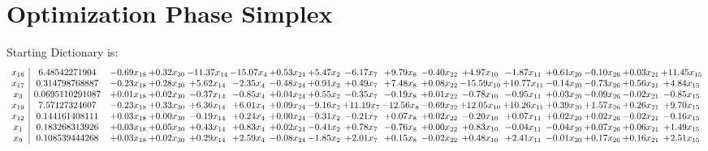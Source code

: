 \documentclass[9pt]{article}
\begin{document}
\section{Optimization Phase Simplex}
Starting Dictionary is:
\[\begin{array}{c| c c@{\hskip 2pt} c@{\hskip 2pt} c@{\hskip 2pt} c@{\hskip 2pt} c@{\hskip 2pt} c@{\hskip 2pt} c@{\hskip 2pt} c@{\hskip 2pt} c@{\hskip 2pt} c@{\hskip 2pt} c@{\hskip 2pt} c@{\hskip 2pt} c@{\hskip 2pt} c@{\hskip 2pt} c@{\hskip 2pt} }
 x_{16}   &  6.48542271904 & -0.69 x_{18} & +  0.32 x_{30} & -11.37 x_{14} & -15.07 x_{4} & +  0.53 x_{24} & +  5.47 x_{2} & -6.17 x_{7} & +  9.79 x_{8} & -0.40 x_{22} & +  4.97 x_{10} & -1.87 x_{11} & +  0.61 x_{20} & -0.10 x_{26} & +  0.03 x_{21} & + 11.45 x_{15}\\
 x_{17}   &  0.314798768887 & -0.23 x_{18} & +  0.28 x_{30} & +  5.62 x_{14} & -2.35 x_{4} & -0.48 x_{24} & +  0.91 x_{2} & +  0.49 x_{7} & +  7.48 x_{8} & +  0.08 x_{22} & -15.59 x_{10} & + 10.77 x_{11} & -0.14 x_{20} & -0.73 x_{26} & +  0.56 x_{21} & +  4.84 x_{15}\\
 x_{3}   &  0.0695110291087 & +  0.01 x_{18} & +  0.02 x_{30} & -0.37 x_{14} & -0.85 x_{4} & +  0.04 x_{24} & +  0.55 x_{2} & -0.35 x_{7} & -0.19 x_{8} & +  0.01 x_{22} & -0.78 x_{10} & -0.95 x_{11} & +  0.03 x_{20} & -0.09 x_{26} & -0.02 x_{21} & -0.85 x_{15}\\
 x_{19}   &  7.57127324607 & -0.23 x_{18} & +  0.33 x_{30} & +  6.36 x_{14} & +  6.01 x_{4} & +  0.09 x_{24} & -9.16 x_{2} & + 11.19 x_{7} & -12.56 x_{8} & -0.69 x_{22} & + 12.05 x_{10} & + 10.26 x_{11} & +  0.39 x_{20} & +  1.57 x_{26} & +  0.26 x_{21} & +  9.70 x_{15}\\
 x_{12}   &  0.144161408111 & +  0.03 x_{18} & +  0.00 x_{30} & -0.19 x_{14} & +  0.24 x_{4} & +  0.00 x_{24} & -0.31 x_{2} & -0.21 x_{7} & +  0.07 x_{8} & +  0.02 x_{22} & -0.20 x_{10} & +  0.07 x_{11} & +  0.02 x_{20} & +  0.02 x_{26} & -0.02 x_{21} & -0.16 x_{15}\\
 x_{1}   &  0.183268313926 & +  0.03 x_{18} & +  0.05 x_{30} & +  0.43 x_{14} & +  0.83 x_{4} & +  0.02 x_{24} & -0.41 x_{2} & +  0.78 x_{7} & -0.76 x_{8} & +  0.00 x_{22} & +  0.83 x_{10} & -0.04 x_{11} & -0.04 x_{20} & +  0.07 x_{26} & +  0.06 x_{21} & +  1.49 x_{15}\\
 x_{9}   &  0.108539444268 & +  0.03 x_{18} & +  0.02 x_{30} & +  0.29 x_{14} & +  2.59 x_{4} & -0.08 x_{24} & -1.85 x_{2} & +  2.01 x_{7} & +  0.15 x_{8} & -0.02 x_{22} & +  0.48 x_{10} & +  2.41 x_{11} & -0.01 x_{20} & +  0.17 x_{26} & +  0.16 x_{21} & +  2.51 x_{15}\\

\end{array}\]
\end{document}
